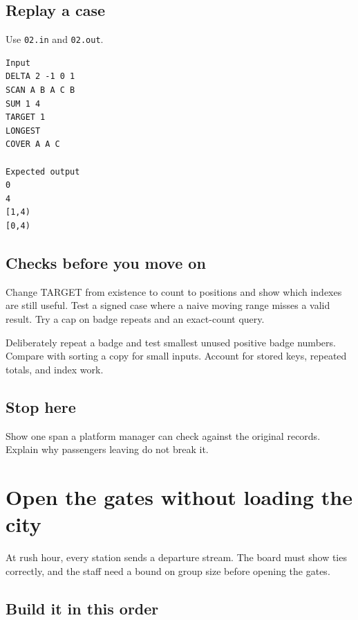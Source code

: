 \documentclass[11pt,letterpaper]{article}
\begin{document}
\subsection*{Replay a case}

Use \texttt{02.in} and \texttt{02.out}.

\begin{samepage}
\small
\begin{verbatim}
Input
DELTA 2 -1 0 1
SCAN A B A C B
SUM 1 4
TARGET 1
LONGEST
COVER A A C

Expected output
0
4
[1,4)
[0,4)
\end{verbatim}
\end{samepage}

\subsection*{Checks before you move on}

Change TARGET from existence to count to positions and show which indexes are still useful. Test a signed case where a naive moving range misses a valid result. Try a cap on badge repeats and an exact-count query.

Deliberately repeat a badge and test smallest unused positive badge numbers. Compare with sorting a copy for small inputs. Account for stored keys, repeated totals, and index work.

\subsection*{Stop here}

Show one span a platform manager can check against the original records. Explain why passengers leaving do not break it.

\clearpage

\section{Open the gates without loading the city}\label{trains:03}

At rush hour, every station sends a departure stream. The board must show ties correctly, and the staff need a bound on group size before opening the gates.

\subsection*{Build it in this order}
\end{document}
